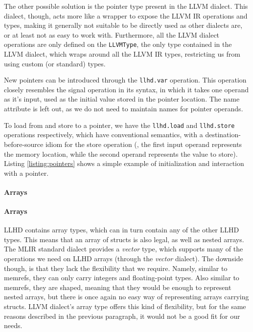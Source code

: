 The other possible solution is the pointer type present in the LLVM dialect. This dialect, though, acts more like a wrapper to expose the LLVM IR operations and types, making it generally not suitable to be directly used as other dialects are, or at least not as easy to work with. Furthermore, all the LLVM dialect operations are only defined on the \texttt{LLVMType}, the only type contained in the LLVM dialect, which wraps around all the LLVM IR types, restricting us from using custom (or standard) types.

New pointers can be introduced through the \texttt{llhd.var} operation. This operation closely resembles the signal operation in its syntax, in which it takes one operand as it's input, used as the initial value stored in the pointer location. The name attribute is left out, as we do not need to maintain names for pointer operands.

To load from and store to a pointer, we have the \texttt{llhd.load} and \texttt{llhd.store} operations respectively, which have conventional semantics, with a destination-before-source idiom for the store operation (\ie, the first input operand represents the memory location, while the second operand represents the value to store). Listing \ref{listing:pointers} shows a simple example of initialization and interaction with a pointer.


\paragraph{Arrays}
\paragraph{Arrays}
LLHD contains array types, which can in turn contain any of the other LLHD types. This means that an array of structs is also legal, as well as nested arrays. The MLIR standard dialect provides a \textit{vector} type, which supports many of the operations we need on LLHD arrays (through the \textit{vector} dialect). The downside though, is that they lack the flexibility that we require. Namely, similar to memrefs, they can only carry integers and floating-point types. Also similar to memrefs, they are shaped, meaning that they would be enough to represent nested arrays, but there is once again no easy way of representing arrays carrying structs. LLVM dialect's array type offers this kind of flexibility, but for the same reasons described in the previous paragraph, it would not be a good fit for our needs.

